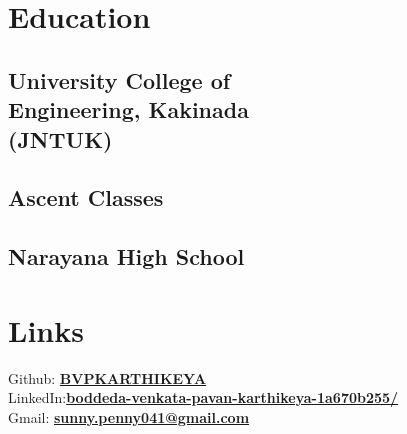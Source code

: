 \documentclass[]{deedy-resume-openfont}
\begin{document}
%
%



%
%

\begin{minipage}[t]{0.33\textwidth} 


\section{Education} 

\subsection{University College of\\ Engineering, Kakinada \\ (JNTUK)}
\sectionsep

\subsection{Ascent Classes}
\sectionsep

\subsection{Narayana High School}
\sectionsep


\section{Links} 
 \textbullet{} Github: {\href{https://github.com/Vidhey012}{\bf BVPKARTHIKEYA}} \\ \textbullet{} LinkedIn:\href{https://www.linkedin.com/in/boddeda-venkata-pavan-karthikeya-1a670b255/}{\bf boddeda-venkata-pavan-karthikeya-1a670b255/} \\
 \textbullet{} Gmail:  \href{mailto:sunny.penny041@gmail.com}{\textbf{sunny.penny041@gmail.com}}


\end{minipage}
\end{document}
